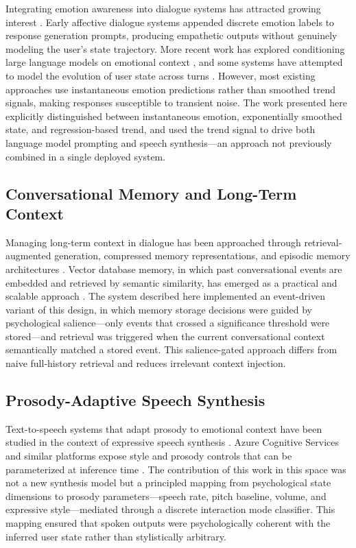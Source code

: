 \documentclass[conference]{IEEEtran}
\begin{document}
Integrating emotion awareness into dialogue systems has attracted growing interest \cite{zhou2018emotional, ma2020survey}. Early affective dialogue systems appended discrete emotion labels to response generation prompts, producing empathetic outputs without genuinely modeling the user's state trajectory. More recent work has explored conditioning large language models on emotional context \cite{rashkin2019empathetic}, and some systems have attempted to model the evolution of user state across turns \cite{ghosal2020cosmic}. However, most existing approaches use instantaneous emotion predictions rather than smoothed trend signals, making responses susceptible to transient noise. The work presented here explicitly distinguished between instantaneous emotion, exponentially smoothed state, and regression-based trend, and used the trend signal to drive both language model prompting and speech synthesis---an approach not previously combined in a single deployed system.

\subsection{Conversational Memory and Long-Term Context}

Managing long-term context in dialogue has been approached through retrieval-augmented generation, compressed memory representations, and episodic memory architectures \cite{xu2022beyond}. Vector database memory, in which past conversational events are embedded and retrieved by semantic similarity, has emerged as a practical and scalable approach \cite{park2023generative}. The system described here implemented an event-driven variant of this design, in which memory storage decisions were guided by psychological salience---only events that crossed a significance threshold were stored---and retrieval was triggered when the current conversational context semantically matched a stored event. This salience-gated approach differs from naive full-history retrieval and reduces irrelevant context injection.

\subsection{Prosody-Adaptive Speech Synthesis}

Text-to-speech systems that adapt prosody to emotional context have been studied in the context of expressive speech synthesis \cite{skerry2018towards}. Azure Cognitive Services and similar platforms expose style and prosody controls that can be parameterized at inference time \cite{tan2021survey}. The contribution of this work in this space was not a new synthesis model but a principled mapping from psychological state dimensions to prosody parameters---speech rate, pitch baseline, volume, and expressive style---mediated through a discrete interaction mode classifier. This mapping ensured that spoken outputs were psychologically coherent with the inferred user state rather than stylistically arbitrary.
\end{document}
